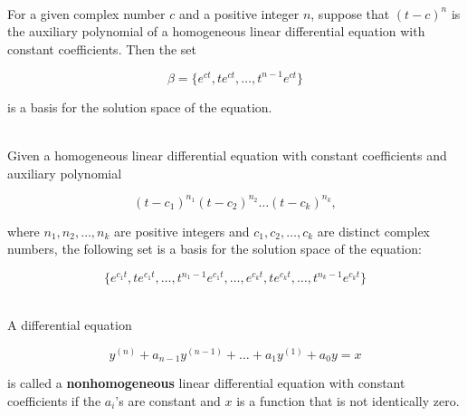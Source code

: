 \begin{lemma}
	\hfill\\
	For a given complex number $c$ and a positive integer $n$, suppose that $(t-c)^n$ is the auxiliary polynomial of a homogeneous linear differential equation with constant coefficients. Then the set
	
	\[\beta = \{e^{ct}, te^{ct}, \dots, t^{n-1}e^{ct}\}\]
	
	is a basis for the solution space of the equation.
\end{lemma}

\begin{theorem}
	\hfill\\
	Given a homogeneous linear differential equation with constant coefficients and auxiliary polynomial
	
	\[(t-c_1)^{n_1}(t-c_2)^{n_2}\dots(t-c_k)^{n_k},\]
	
	where $n_1, n_2, \dots, n_k$ are positive integers and $c_1, c_2, \dots, c_k$ are distinct complex numbers, the following set is a basis for the solution space of the equation:
	
	\[\{e^{c_1t}, te^{c_1t},\dots, t^{n_1-1}e^{c_1t}, \dots, e^{c_kt}, te^{c_kt}, \dots, t^{n_k-1}e^{c_kt}\}\]
\end{theorem}

\begin{definition}
	\hfill\\
	A differential equation
	
	\[y^{(n)} + a_{n-1}y^{(n-1)} + \dots + a_1y^{(1)} + a_0y = x\]
	
	is called a \textbf{nonhomogeneous} linear differential equation with constant coefficients if the $a_i$'s are constant and $x$ is a function that is not identically zero.
\end{definition}